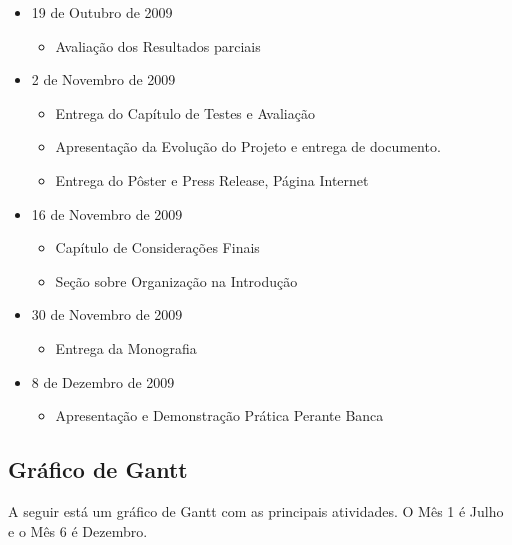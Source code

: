 \documentclass[]{article}
\begin{document}
\begin{itemize}
  \item 19 de Outubro de 2009
  \begin{itemize}
    \item Avaliação dos Resultados parciais
  \end{itemize}
  
  \item 2 de Novembro de 2009
  \begin{itemize}
    \item Entrega do Capítulo de Testes e Avaliação
    \item Apresentação da Evolução do Projeto e entrega de documento.
    \item Entrega do Pôster e Press Release, Página Internet
  \end{itemize}
  
  \item 16 de Novembro de 2009
  \begin{itemize}
    \item Capítulo de Considerações Finais
    \item Seção sobre Organização na Introdução
  \end{itemize}
  
  \item 30 de Novembro de 2009
  \begin{itemize}
    \item Entrega da Monografia
  \end{itemize}
  
  \item 8 de Dezembro de 2009
  \begin{itemize}
    \item Apresentação e Demonstração Prática Perante Banca
  \end{itemize}
\end{itemize}

\subsection{Gráfico de Gantt}

A seguir está um gráfico de Gantt com as principais atividades. O Mês 1 é Julho e o Mês 6 é Dezembro.
\end{document}
